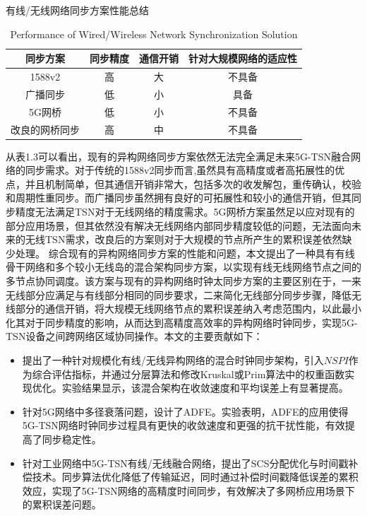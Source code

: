 \documentclass[UTF8,a4paper,12pt]{ctexart}
\numberwithin{equation}{section}
\begin{document}
	\begin{table}[!htbp]
		\centering
		\caption{有线/无线网络同步方案性能总结}
		\vspace{-10pt}
		\caption{Performance of Wired/Wireless Network Synchronization Solution}
		\begin{tabular}{|c| c|c|c|}
			\hline
			\textbf{同步方案}   &\textbf{同步精度}  & \textbf{通信开销}  & \textbf{针对大规模网络的适应性}  \\
			\hline
			1588v2    & 高   & 大    & 不具备                \\
			\hline
			广播同步 &  低 &  小 & 具备   \\
			\hline
			5G网桥 &低   &小     &不具备  \\
			\hline
			改良的网桥同步 &高  & 中        & 不具备    \\
			\hline
		\end{tabular}
	\end{table}
	
	从表1.3可以看出，现有的异构网络同步方案依然无法完全满足未来5G-TSN融合网络的同步需求。对于传统的1588v2同步而言,虽然具有高精度或者高拓展性的优点，并且机制简单，但其通信开销非常大，包括多次的收发解包，重传确认，校验和周期性重同步。而广播同步虽然拥有良好的可拓展性和较小的通信开销，但其同步精度无法满足TSN对于无线网络的精度需求。5G网桥方案虽然足以应对现有的部分应用场景，但其依然没有解决无线网络内部同步精度较低的问题，无法面向未来的无线TSN需求，改良后的方案则对于大规模的节点所产生的累积误差依然缺少处理。
	综合现有的异构网络同步方案的性能和问题，本文提出了一种具有有线骨干网络和多个较小无线岛的混合架构同步方案，以实现有线无线网络节点之间的多节点协同调度。该方案与现有的异构网络时钟太同步方案的主要区别在于，一来无线部分应满足与有线部分相同的同步要求，二来简化无线部分同步步骤，降低无线部分的通信开销，将大规模无线网络节点的累积误差纳入考虑范围内，以此最小化其对于同步精度的影响，从而达到高精度高效率的异构网络时钟同步，实现5G-TSN设备之间跨网络区域协同操作。本文的主要贡献如下：
	\begin{itemize}
		\item 提出了一种针对规模化有线/无线异构网络的混合时钟同步架构，引入$NSPI$作为综合评估指标，并通过分层算法和修改Kruskal或Prim算法中的权重函数实现优化。实验结果显示，该混合架构在收敛速度和平均误差上有显著提高。
		
		\item 针对5G网络中多径衰落问题，设计了ADFE。实验表明，ADFE的应用使得5G-TSN网络时钟同步过程具有更快的收敛速度和更强的抗干扰性能，有效提高了同步稳定性。
		
		\item 针对工业网络中5G-TSN有线/无线融合网络，提出了SCS分配优化与时间戳补偿技术。同步算法优化降低了传输延迟，同时通过补偿时间戳降低误差的累积效应，实现了5G-TSN网络的高精度时间同步，有效解决了多网桥应用场景下的累积误差问题。
	\end{itemize}
	
\end{document}
